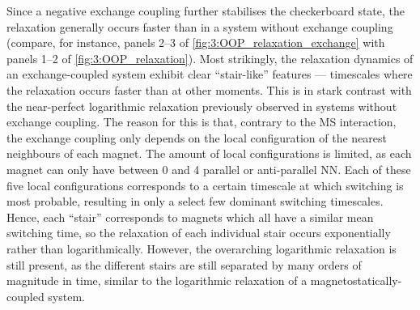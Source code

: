 
Since a negative exchange coupling further stabilises the checkerboard state, the relaxation generally occurs faster than in a system without exchange coupling (compare, for instance, panels 2--3 of \cref{fig:3:OOP_relaxation_exchange} with panels 1--2 of \cref{fig:3:OOP_relaxation}).
Most strikingly, the relaxation dynamics of an exchange-coupled system exhibit clear ``stair-like'' features --- timescales where the relaxation occurs faster than at other moments.
This is in stark contrast with the near-perfect logarithmic relaxation previously observed in systems without exchange coupling.
The reason for this is that, contrary to the MS interaction, the exchange coupling only depends on the local configuration of the nearest neighbours of each magnet.
The amount of local configurations is limited, as each magnet can only have between 0 and 4 parallel or anti-parallel NN.
Each of these five local configurations corresponds to a certain timescale at which switching is most probable, resulting in only a select few dominant switching timescales.
Hence, each ``stair'' corresponds to magnets which all have a similar mean switching time, so the relaxation of each individual stair occurs exponentially rather than logarithmically.
However, the overarching logarithmic relaxation is still present, as the different stairs are still separated by many orders of magnitude in time, similar to the logarithmic relaxation of a magnetostatically-coupled system. \\\par

